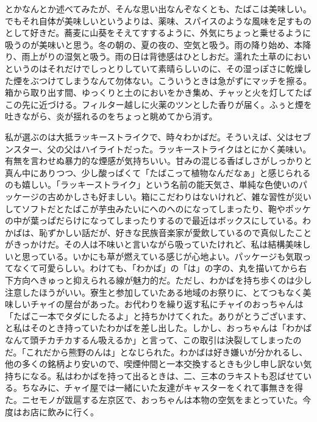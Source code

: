 とかなんとか述べてみたが、そんな思い出なんぞなくとも、たばこは美味しい。でもそれ自体が美味しいというよりは、薬味、スパイスのような風味を足すものとして好きだ。蕎麦に山葵をそえてすするように、外気にちょっと乗せるように吸うのが美味いと思う。冬の朝の、夏の夜の、空気と吸う。雨の降り始め、本降り、雨上がりの湿気と吸う。雨の日は背徳感はひとしおだ。濡れた土草のにおいというのはそれだけでしっとりしていて素晴らしいのに、その湿っぽさに乾燥した煙をぶつけてしまうなんて勿体ない。こういうときは急がずにマッチを擦る。箱から取り出す間、ゆっくりと土のにおいをかき集め、チャッと火を灯してたばこの先に近づける。フィルター越しに火薬のツンとした香りが届く。ふぅと煙を吐きながら、炎が揺れるのをちょっと眺めてから消す。

私が選ぶのは大抵ラッキーストライクで、時々わかばだ。そういえば、父はセブンスター、父の父はハイライトだった。ラッキーストライクはとにかく美味い。有無を言わせぬ暴力的な煙感が気持ちいい。甘みの混じる香ばしさがしっかりと真ん中にありつつ、少し酸っぱくて「たばこって植物なんだなぁ」と感じられるのも嬉しい。「ラッキーストライク」という名前の能天気さ、単純な色使いのパッケージの古めかしさも好ましい。箱にこだわりはないけれど、雑な習性が災いしてソフトだとたばこが芋虫みたいにへのへのになってしまったり、鞄やポッケの中が葉っぱだらけになってしまったりするので最近はボックスにしている。わかばは、恥ずかしい話だが、好きな民族音楽家が愛飲しているので真似したことがきっかけだ。その人は不味いと言いながら吸っていたけれど、私は結構美味しいと思っている。いかにも草が燃えている感じが心地よい。パッケージも気取ってなくて可愛らしい。わけても、「わかば」の「は」の字の、丸を描いてから右下方向へきゅっと抑えられる線が魅力的だ。ただし、わかばを持ち歩くのは少し注意したほうがいい。寮生と参加していたある地域のお祭りに、とてつもなく美味しいチャイの屋台があった。お代わりを繰り返す私にチャイのおっちゃんは「たばこ一本でタダにしたるよ」と持ちかけてくれた。ありがとうございます、と私はそのとき持っていたわかばを差し出した。しかし、おっちゃんは「わかばなんて頭チカチカするん吸えるか」と言って、この取引は決裂してしまったのだ。「これだから熊野のんは」となじられた。わかばは好き嫌いが分かれるし、他の多くの銘柄より安いので、喫煙仲間と一本交換するときも少し申し訳ない気持ちになる。私はわかばを持って出るときは、二、三本のラキストも忍ばせている。ちなみに、チャイ屋では一緒にいた友達がキャスターをくれて事無きを得た。ニセモノが跋扈する左京区で、おっちゃんは本物の空気をまとっていた。今度はお店に飲みに行く。

